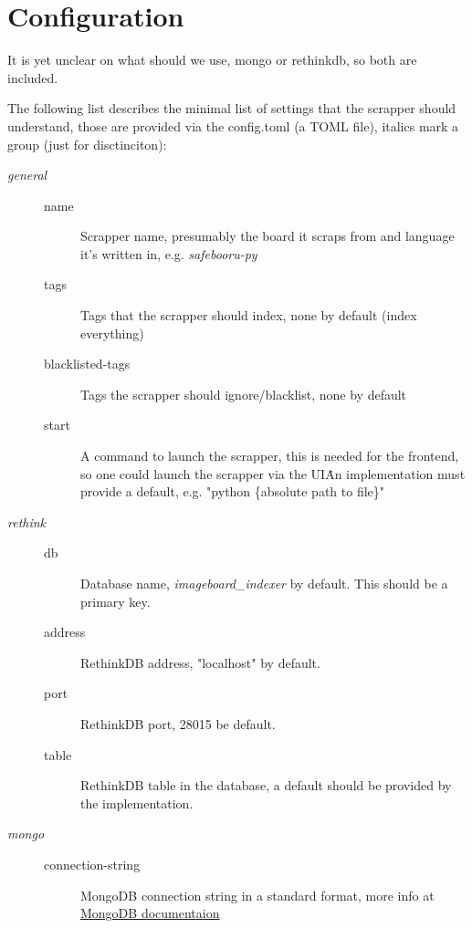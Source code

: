 \documentclass{article}
\begin{document}
\pagebreak

\section{Configuration}

It is yet unclear on what should we use, mongo or rethinkdb, so both are included.

The following list describes the minimal list of settings that the scrapper
should understand, those are provided via the config.toml (a TOML file),
italics mark a group (just for disctinciton):

\begin{description}
\item [\textit{general}] \hfill
  \begin{description}
    \item [name] Scrapper name, presumably the board it scraps from and language it's written in,
      e.g. \textit{safebooru-py}
    \item [tags] Tags that the scrapper should index, none by default (index everything)
    \item [blacklisted-tags] Tags the scrapper should ignore/blacklist, none by default
    \item [start] A command to launch the scrapper, this is needed for the frontend,
      so one could launch the scrapper via the UI\. An implementation must provide a default,
      e.g. "python \{absolute path to file\}"
  \end{description}

\item [\textit{rethink}] \hfill
  \begin{description}
  \item [db] Database name, \textit{imageboard\_indexer} by default. This should be a primary key.
  \item [address] RethinkDB address, "localhost" by default.
  \item [port] RethinkDB port, 28015 be default.
  \item [table] RethinkDB table in the database, a default should be provided by the implementation.
  \end{description}

\item [\textit{mongo}] \hfill
  \begin{description}
  \item [connection-string] MongoDB connection string in a standard format, more info at
    \href{https://docs.mongodb.com/manual/reference/connection-string/}{MongoDB documentaion}


\end{description}
\end{description}
\end{document}
